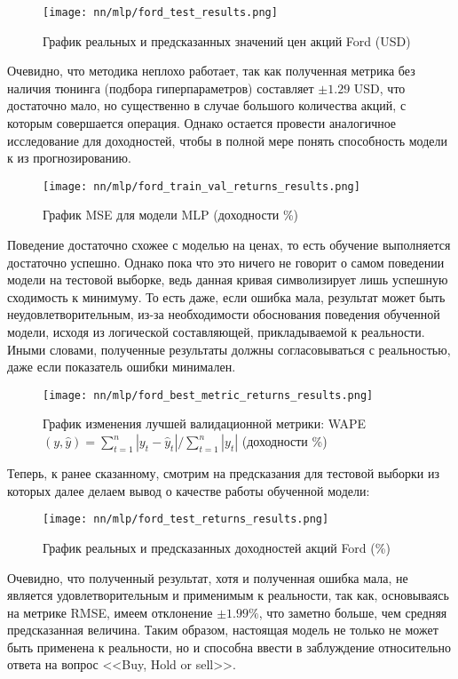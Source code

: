 \begin{figure}[H]
	\centering
	\texttt{[image: nn/mlp/ford\_test\_results.png]}
	\caption{График реальных и предсказанных значений цен акций Ford (USD)}
	\label{fig::ford_test_results}
\end{figure}
Очевидно, что методика неплохо работает, так как полученная метрика без наличия тюнинга (подбора гиперпараметров) составляет $\pm 1.29$ USD, что достаточно мало, но существенно в случае большого количества акций, с которым совершается операция. Однако остается провести аналогичное исследование для доходностей, чтобы в полной мере понять способность модели к из прогнозированию.
\begin{figure}[H]
	\centering
	\texttt{[image: nn/mlp/ford\_train\_val\_returns\_results.png]}
	\caption{График MSE для модели MLP (доходности \%)}
	\label{fig::ford_train_val_returns_results}
\end{figure}
Поведение достаточно схожее с моделью на ценах, то есть обучение выполняется достаточно успешно. Однако пока что это ничего не говорит о самом поведении модели на тестовой выборке, ведь данная кривая символизирует лишь успешную сходимость к минимуму. То есть даже, если ошибка мала, результат может быть неудовлетворительным, из-за необходимости обоснования поведения обученной модели, исходя из логической составляющей, прикладываемой к реальности. Иными словами, полученные результаты должны согласовываться с реальностью, даже если показатель ошибки минимален.
\begin{figure}[H]
	\centering
	\texttt{[image: nn/mlp/ford\_best\_metric\_returns\_results.png]}
	\caption{График изменения лучшей валидационной метрики: WAPE$(y, \hat{y}) = \sum_{t = 1}^n |y_t - \hat{y}_t| / \sum_{t = 1}^n |y_t|$ (доходности \%)}
	\label{fig::ford_best_metric_returns_results}
\end{figure}
Теперь, к ранее сказанному, смотрим на предсказания для тестовой выборки из которых далее делаем вывод о качестве работы обученной модели:
\begin{figure}[H]
	\centering
	\texttt{[image: nn/mlp/ford\_test\_returns\_results.png]}
	\caption{График реальных и предсказанных доходностей акций Ford (\%)}
	\label{fig::ford_test_returns_results}
\end{figure}
Очевидно, что полученный результат, хотя и полученная ошибка мала, не является удовлетворительным и применимым к реальности, так как, основываясь на метрике RMSE, имеем отклонение $\pm 1.99\%$, что заметно больше, чем средняя предсказанная величина. Таким образом, настоящая модель не только не может быть применена к реальности, но и способна ввести в заблуждение относительно ответа на вопрос <<Buy, Hold or sell>>. 

